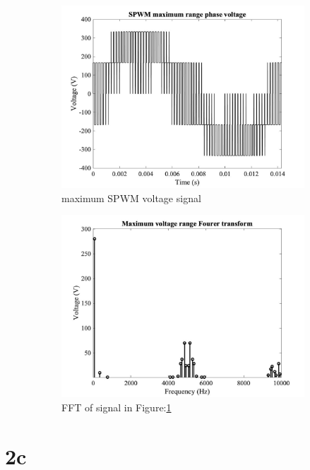 \documentclass{article}
\begin{document}
\begin{figure}[H]
\begin{subfigure}{.5\textwidth}
  \centering
\includegraphics[scale=0.15]{2b3.jpg}
\caption{maximum SPWM voltage signal}
\label{fig:22ba}
\end{subfigure}%
\begin{subfigure}{.5\textwidth}
  \centering
\includegraphics[scale=0.15]{2b4.jpg}
\caption{FFT of signal in Figure:\ref{fig:22ba}}
\label{fig:fftOne}
\end{subfigure}
\caption{}
\label{fig:fig5}
\end{figure}

\section*{2c}
\end{document}
